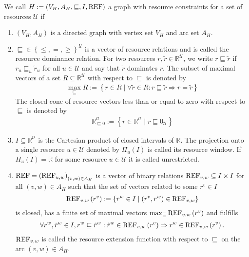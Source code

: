 \begin{definition}

We call ${H:=\left(V_H,A_H,\sqsubseteq,I,\operatorname{REF}\right)}$ a graph with resource constraints for a set of resources $\mathcal{U}$ if
\begin{enumerate}
	\item{$\left(V_H,A_H\right)$ is a directed graph with vertex set $V_H$ and arc set $A_H$.}
	\item{$\sqsubseteq\in\left\{\leq,=,\geq\right\}^{\mathcal{U}}$ is a vector of resource relations and is called the resource dominance relation.}
		For two resources ${r,\tilde{r}\in\mathbb{R}^{\mathcal{U}}}$, we write ${r\sqsubseteq\tilde{r}}$ if ${r_u\sqsubseteq_u \tilde{r}_u}$ for all $u\in\mathcal{U}$ and say that $\tilde{r}$ dominates $r$. The subset of maximal vectors of a set $R\subseteq\mathbb{R}^{\mathcal{U}}$ with respect to $\sqsubseteq$ is denoted by
		\begin{align*}
			\max_{\sqsubseteq} R := \left\{r\in R\mid \forall\tilde{r}\in R: r\sqsubseteq\tilde{r}\Rightarrow r=\tilde{r}\right\}
		\end{align*}
		The closed cone of resource vectors less than or equal to zero with respect to $\sqsubseteq$ is denoted by
		\begin{align*}
			\mathbb{R}^{\mathcal{U}}_{\sqsubseteq 0} := \left\{r\in\mathbb{R}^{\mathcal{U}}\mid r\sqsubseteq 0_{\mathcal{U}}\right\}
		\end{align*}
	\item{$I\subseteq\mathbb{R}^{\mathcal{U}}$ is the Cartesian product of closed intervals of $\mathbb{R}$.}
		The projection onto a single resource $u\in\mathcal{U}$ denoted by $\Pi_u(I)$ is called its resource window. If $\Pi_u(I)=\mathbb{R}$ for some resource $u\in\mathcal{U}$ it is called unrestricted.
	\item{$\operatorname{REF} = \left(\operatorname{REF}_{u,w}\right)_{(v,w)\in A_H}$}
		is a vector of binary relations ${\operatorname{REF}_{v,w}\subseteq I\times I}$ for all ${(v,w)\in A_H}$ such that the set of vectors related to some ${r^v\in I}$
		\begin{align*}
			\operatorname{REF}_{v,w}\left(r^v\right) := \left\{r^w\in I\mid \left(r^v,r^w\right)\in\operatorname{REF}_{v,w}\right\}
		\end{align*}
		is closed, has a finite set of maximal vectors ${\max_{\sqsubseteq}\operatorname{REF}_{v,w}\left(r^v\right)}$ and fulfills
		\begin{align*}
			\forall r^w,\tilde{r}^w\in I,r^w\sqsubseteq\tilde{r}^w : \tilde{r}^w\in\operatorname{REF}_{v,w}\left(r^v\right) \Rightarrow r^w\in\operatorname{REF}_{v,w}\left(r^v\right).
		\end{align*}
		$\operatorname{REF}_{v,w}$ is called the resource extension function with respect to $\sqsubseteq$ on the arc $(v,w)\in A_H$.
\end{enumerate}
	
\end{definition}

